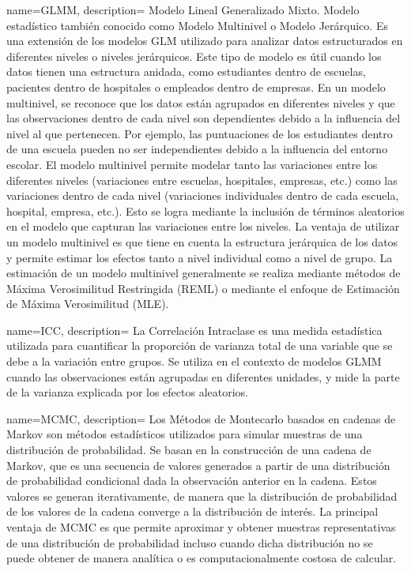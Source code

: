 {
    name=GLMM,
    description={
        Modelo Lineal Generalizado Mixto. Modelo estadístico también conocido como Modelo Multinivel o Modelo Jerárquico.
        Es una extensión de los modelos \gls{GLM} utilizado para analizar datos estructurados en diferentes niveles o niveles jerárquicos.
        Este tipo de modelo es útil cuando los datos tienen una estructura anidada, como estudiantes dentro de escuelas,
        pacientes dentro de hospitales o empleados dentro de empresas.
        En un modelo multinivel, se reconoce que los datos están agrupados en diferentes niveles
        y que las observaciones dentro de cada nivel son dependientes debido a la influencia del nivel
        al que pertenecen. Por ejemplo, las puntuaciones de los estudiantes dentro de una escuela pueden no ser independientes
        debido a la influencia del entorno escolar.
        El modelo multinivel permite modelar tanto las variaciones entre los diferentes niveles
        (variaciones entre escuelas, hospitales, empresas, etc.)
        como las variaciones dentro de cada nivel (variaciones individuales dentro de cada escuela, hospital, empresa, etc.).
        Esto se logra mediante la inclusión de términos aleatorios en el modelo que capturan
        las variaciones entre los niveles. La ventaja de utilizar un modelo multinivel es que tiene en cuenta la estructura jerárquica de los datos y permite estimar los efectos tanto a nivel individual como a nivel de grupo. La estimación de un modelo multinivel generalmente se realiza mediante métodos de Máxima Verosimilitud Restringida (REML) o mediante el enfoque de Estimación de Máxima Verosimilitud (MLE).
    }
}


{
    name=ICC,
    description={
        La Correlación Intraclase es una medida estadística utilizada para cuantificar la proporción de varianza total
        de una variable que se debe a la variación entre grupos. Se utiliza en el contexto de modelos \gls{GLMM}
        cuando las observaciones están agrupadas en diferentes unidades,
        y mide la parte de la varianza explicada por los
        efectos aleatorios.
    }
}

{
    name=MCMC,
    description={
        Los Métodos de Montecarlo basados en cadenas de Markov son métodos estadísticos utilizados para simular
        muestras de una distribución de probabilidad.
        Se basan en la construcción de una cadena de Markov,
        que es una secuencia de valores generados a partir de una distribución de probabilidad condicional dada
        la observación anterior en la cadena.
        Estos valores se generan iterativamente, de manera que la distribución de probabilidad de los valores
        de la cadena converge a la distribución de interés.        
        La principal ventaja de MCMC es que permite aproximar
        y obtener muestras representativas de una distribución de probabilidad
        incluso cuando dicha distribución no se puede obtener de manera analítica o es
        computacionalmente costosa de calcular.
    }
}


